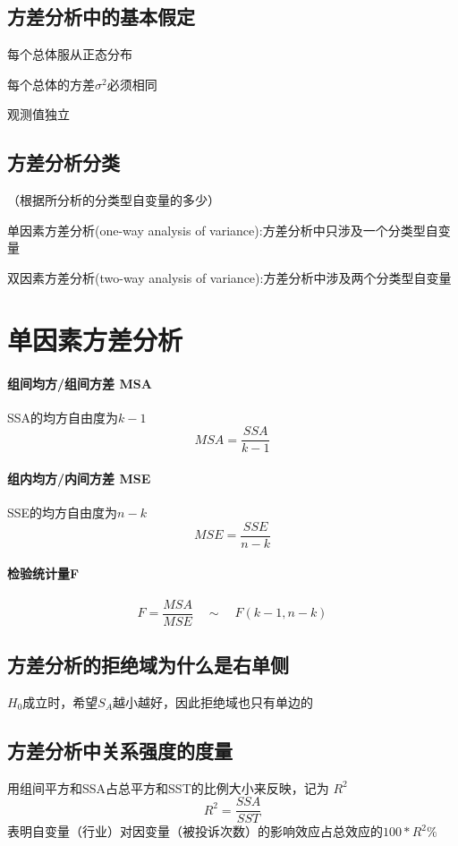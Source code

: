 \documentclass[UTF8,10pt]{book}
\begin{document}
\subsection{方差分析中的基本假定}	
每个总体服从正态分布

每个总体的方差$\sigma^2$必须相同

观测值独立

\subsection{方差分析分类}
 （根据所分析的分类型自变量的多少）	
 
 单因素方差分析(one-way analysis of variance):方差分析中只涉及一个分类型自变量 
 
 双因素方差分析(two-way analysis of variance):方差分析中涉及两个分类型自变量

\section{单因素方差分析}

\paragraph{组间均方/组间方差 MSA}
    SSA的均方自由度为$k-1$ 
    $$ MSA = \frac{SSA}{k-1} $$

\paragraph{组内均方/内间方差 MSE}	
    SSE的均方自由度为$n-k$ 
    $$ MSE = \frac{SSE}{n-k} $$

\paragraph{检验统计量F}	
$$ F = \frac{MSA}{MSE} \quad \sim \quad F(k-1,n-k) $$

\subsection{方差分析的拒绝域为什么是右单侧}
	$H_0$成立时，希望$S_A$越小越好，因此拒绝域也只有单边的
\subsection{方差分析中关系强度的度量}	
用组间平方和SSA占总平方和SST的比例大小来反映，记为
$R^2$ 
$$ R^2 = \frac{SSA}{SST} $$ 
表明自变量（行业）对因变量（被投诉次数）的影响效应占总效应的$100*R^2\%$
\end{document}
